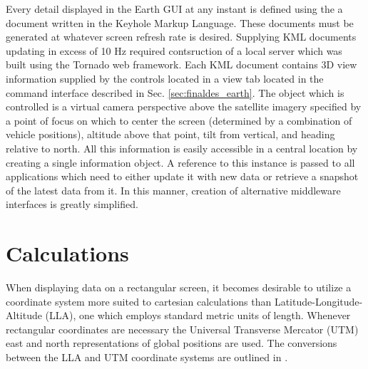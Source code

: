 Every detail displayed in the Earth GUI at any instant is defined using the a document written in the Keyhole Markup Language. These documents must be generated at whatever screen refresh rate is desired. Supplying KML documents updating in excess of 10 Hz required contsruction of a local server which was built using the Tornado web framework. Each KML document contains 3D view information supplied by the controls located in a view tab located in the command interface described in Sec. \ref{sec:finaldes_earth}. The object which is controlled is a virtual camera perspective above the satellite imagery specified by a point of focus on which to center the screen (determined by a combination of vehicle positions), altitude above that point, tilt from vertical, and heading relative to north.
All this information is easily accessible in a central location by creating a single information object. A reference to this instance is passed to all applications which need to either update it with new data or retrieve a snapshot of the latest data from it. In this manner, creation of alternative middleware interfaces is greatly simplified.

\section{Calculations} \label{sec:guicalc}

When displaying data on a rectangular screen, it becomes desirable to utilize a coordinate system more suited to cartesian calculations than Latitude-Longitude-Altitude (LLA), one which employs standard metric units of length. Whenever rectangular coordinates are necessary the Universal Transverse Mercator (UTM) east and north representations of global positions are used. The conversions between the LLA and UTM coordinate systems are outlined in \cite{projections}.

